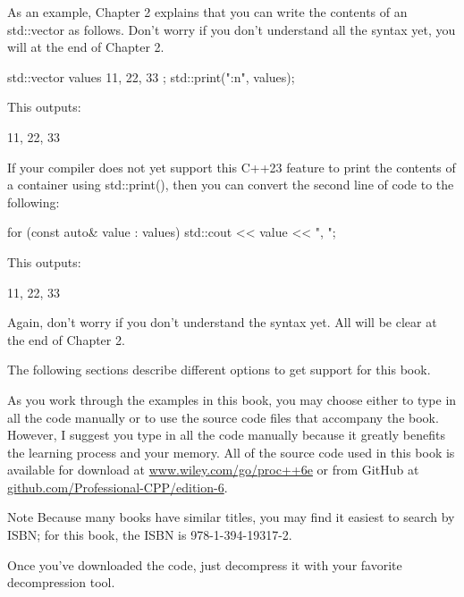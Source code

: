 As an example, Chapter 2 explains that you can write the contents of an std::vector as follows.
Don’t worry if you don’t understand all the syntax yet, you will at the end of Chapter 2.

\begin{cpp}
std::vector values { 11, 22, 33 };
std::print("{:n}", values);
\end{cpp}

This outputs:

\begin{shell}
11, 22, 33
\end{shell}

If your compiler does not yet support this C++23 feature to print the contents of a container using std::print(), then you can convert the second line of code to the following:

\begin{cpp}
for (const auto& value : values) { std::cout << value << ", "; }
\end{cpp}

This outputs:

\begin{shell}
11, 22, 33
\end{shell}

Again, don’t worry if you don’t understand the syntax yet. All will be clear at the end of Chapter 2.


The following sections describe different options to get support for this book.


As you work through the examples in this book, you may choose either to type in all the code manually or to use the source code files that accompany the book. However, I suggest you type in all the code manually because it greatly benefits the learning process and your memory. All of the source code used in this book is available for download at \url{www.wiley.com/go/proc++6e} or from GitHub at \url{github.com/Professional-CPP/edition-6}.

\begin{myNotic}{Note}
Because many books have similar titles, you may find it easiest to search by ISBN; for this book, the ISBN is 978-1-394-19317-2.
\end{myNotic}

Once you’ve downloaded the code, just decompress it with your favorite decompression tool.

